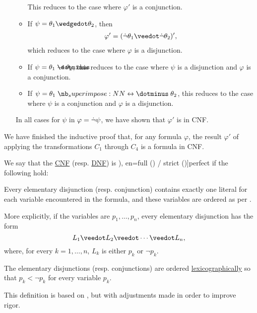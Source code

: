 \begin{defproof}
\begin{itemize}
\begin{itemize}
      This reduces to the case where \( \varphi' \) is a conjunction.

      \item If \( \psi = \theta_1 \synwedge \theta_2 \), then
      \begin{align*}
        \varphi'
        =
        (\synneg \theta_1 \synvee \synneg \theta_2)',
      \end{align*}
      which reduces to the case where \( \varphi \) is a disjunction.

      \item If \( \psi = \theta_1 \synimplies \theta_2 \), this reduces to the case where \( \psi \) is a disjunction and \( \varphi \) is a conjunction.
      \item If \( \psi = \theta_1 \syniff \theta_2 \), this reduces to the case where \( \psi \) is a conjunction and \( \varphi \) is a disjunction.
    \end{itemize}

    In all cases for \( \psi \) in \( \varphi = \dot\neg \psi \), we have shown that \( \varphi' \) is in CNF.
  \end{itemize}

  We have finished the inductive proof that, for any formula \( \varphi \), the result \( \varphi' \) of applying the transformations \( C_1 \) through \( C_4 \) is a formula in CNF.
\end{defproof}

\begin{definition}\label{def:perfect_cnf_and_dnf}\mimprovised
  We say that the \hyperref[def:cnf_and_dnf]{CNF} (resp. \hyperref[def:cnf_and_dnf]{DNF}) is \term[ru=совершенная (\cite[def. 6.3; def. 6.4]{Эдельман1975}), en=full (\cite[38]{Rosen1999}) / strict (\cite[def. 1.3.10]{Hinman2005})]{perfect} if the following hold:
  \begin{thmenum}
     Every elementary disjunction (resp. conjunction) contains exactly one literal for each variable encountered in the formula, and these variables are ordered as per .

    More explicitly, if the variables are \( p_1, \ldots, p_n \), every elementary disjunction has the form
    \begin{equation*}
      L_1 \synvee L_2 \synvee \cdots \synvee L_n,
    \end{equation*}
    where, for every \( k = 1, \ldots, n \), \( L_k \) is either \( p_k \) or \( \neg p_k \).

     The elementary disjunctions (resp. conjunctions) are ordered \hyperref[def:lexicographic_order]{lexicographically} so that \( p_k < \neg p_k \) for every variable \( p_k \).
  \end{thmenum}
\end{definition}
\begin{comments}
  \item This definition is based on \cite[def. 6.3; def. 6.4]{Эдельман1975}, but with adjustments made in order to improve rigor.
\end{comments}

